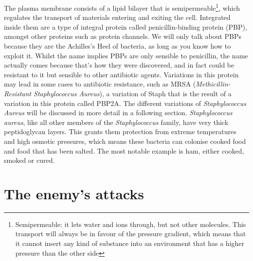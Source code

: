 The plasma membrane consists of a lipid bilayer that is semipermeable\footnote{Semipermeable: it lets water and ions through, but not other molecules. This transport will always be in favour of the pressure gradient, which means that it cannot insert any kind of substance into an environment that has a higher pressure than the other side}, which regulates the transport of materials entering and exiting the cell. Integrated inside them are a type of integral protein called penicillin-binding protein (PBP), amongst other  proteins such as protein channels. We will only talk about PBPs because they are the Achilles's Heel of bacteria, as long as you know how to exploit it. Whilst the name implies PBPs are only sensible to penicillin, the name actually comes because that's how they were discovered, and in fact could be resistant to it but sensible to other antibiotic agents. Variations in this protein may lead in some cases to antibiotic resistance, such as MRSA (\emph{Methicillin-Resistant Staphylococcus Aureus}), a variation of Staph that is the result of a variation in this protein called PBP2A. The different variations of \emph{Staphylococcus Aureus} will be discussed in more detail in a following section. \newline
\emph{Staphylococcus aureus}, like all other members of the \emph{Staphylococcus} family, have very thick peptidoglycan layers. This grants them protection from extreme temperatures and high osmotic pressures, which means these bacteria can colonise cooked food and food that has been salted. The most notable example is ham, either cooked, smoked or cured.
\section{The enemy's attacks}
